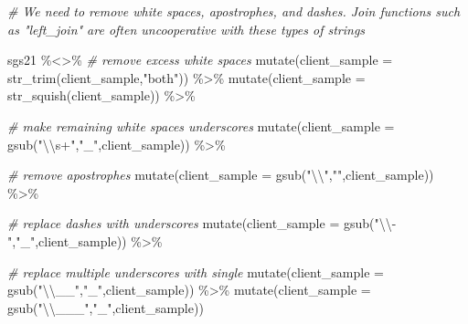 \documentclass[
]{book}
\newenvironment{Shaded}{\begin{snugshade}}{\end{snugshade}}
\newcommand{\AttributeTok}[1]{\textcolor[rgb]{0.77,0.63,0.00}{#1}}
\newcommand{\CommentTok}[1]{\textcolor[rgb]{0.56,0.35,0.01}{\textit{#1}}}
\newcommand{\FunctionTok}[1]{\textcolor[rgb]{0.00,0.00,0.00}{#1}}
\newcommand{\NormalTok}[1]{#1}
\newcommand{\SpecialCharTok}[1]{\textcolor[rgb]{0.00,0.00,0.00}{#1}}
\newcommand{\StringTok}[1]{\textcolor[rgb]{0.31,0.60,0.02}{#1}}
\begin{document}
\begin{Shaded}
\begin{Highlighting}[]
  
\CommentTok{\# We need to remove white spaces, apostrophes, and dashes. Join functions such as "left\_join" are often uncooperative with these types of strings}
  
\NormalTok{sgs21 }\SpecialCharTok{\%\textless{}\textgreater{}\%}
    \CommentTok{\# remove excess white spaces}
  \FunctionTok{mutate}\NormalTok{(}\AttributeTok{client\_sample =} \FunctionTok{str\_trim}\NormalTok{(client\_sample,}\StringTok{"both"}\NormalTok{)) }\SpecialCharTok{\%\textgreater{}\%}
  \FunctionTok{mutate}\NormalTok{(}\AttributeTok{client\_sample =} \FunctionTok{str\_squish}\NormalTok{(client\_sample)) }\SpecialCharTok{\%\textgreater{}\%}
  
  \CommentTok{\# make remaining white spaces underscores}
  \FunctionTok{mutate}\NormalTok{(}\AttributeTok{client\_sample =} \FunctionTok{gsub}\NormalTok{(}\StringTok{"}\SpecialCharTok{\textbackslash{}\textbackslash{}}\StringTok{s+"}\NormalTok{,}\StringTok{"\_"}\NormalTok{,client\_sample)) }\SpecialCharTok{\%\textgreater{}\%}
  
  \CommentTok{\# remove apostrophes}
  \FunctionTok{mutate}\NormalTok{(}\AttributeTok{client\_sample =} \FunctionTok{gsub}\NormalTok{(}\StringTok{"}\SpecialCharTok{\textbackslash{}\textbackslash{}}\StringTok{\textquotesingle{}"}\NormalTok{,}\StringTok{""}\NormalTok{,client\_sample)) }\SpecialCharTok{\%\textgreater{}\%}
  
  \CommentTok{\# replace dashes with underscores}
  \FunctionTok{mutate}\NormalTok{(}\AttributeTok{client\_sample =} \FunctionTok{gsub}\NormalTok{(}\StringTok{"}\SpecialCharTok{\textbackslash{}\textbackslash{}}\StringTok{{-}"}\NormalTok{,}\StringTok{"\_"}\NormalTok{,client\_sample)) }\SpecialCharTok{\%\textgreater{}\%}
  
  \CommentTok{\# replace multiple underscores with single}
  \FunctionTok{mutate}\NormalTok{(}\AttributeTok{client\_sample =} \FunctionTok{gsub}\NormalTok{(}\StringTok{"}\SpecialCharTok{\textbackslash{}\textbackslash{}}\StringTok{\_\_"}\NormalTok{,}\StringTok{"\_"}\NormalTok{,client\_sample)) }\SpecialCharTok{\%\textgreater{}\%}
  \FunctionTok{mutate}\NormalTok{(}\AttributeTok{client\_sample =} \FunctionTok{gsub}\NormalTok{(}\StringTok{"}\SpecialCharTok{\textbackslash{}\textbackslash{}}\StringTok{\_\_\_"}\NormalTok{,}\StringTok{"\_"}\NormalTok{,client\_sample))}


\end{Highlighting}
\end{Shaded}
\end{document}

